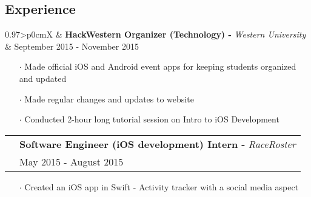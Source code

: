 \documentclass[letterpaper, oneside, final]{scrartcl} %
\newcommand{\gray}{\rowcolor[gray]{.90}} %
\begin{document}
\begin{center}

\vspace{-3mm}

\section{Experience}

\renewcommand{\arraystretch}{1.3}

\begin{tabularx}{0.97\linewidth}{>{\raggedleft\scshape}p{0cm}X}
\gray & \textbf{HackWestern Organizer (Technology) -} \textit{Western University}\\
\gray & {September 2015 - November 2015}\\
\end{tabularx}
\vspace{-0.1cm}
\begin{itemize} \itemsep-0.2cm
\item[$\cdot$] Made official iOS and Android event apps for keeping students organized and updated
\item[$\cdot$]  Made regular changes and updates to website\\
\item[$\cdot$]  Conducted 2-hour long tutorial session on Intro to iOS Development \\
\end{itemize}

\vspace{-0.05cm}

\begin{tabularx}{0.97\linewidth}{>{\raggedleft\scshape}p{0cm}X}
\gray & \textbf{Software Engineer (iOS development) Intern -} \textit{RaceRoster}\\
\gray & {May 2015 - August 2015}\\
\end{tabularx}
\vspace{-0.1cm}
\begin{itemize} \itemsep-0.2cm
\item[$\cdot$] Created an iOS app in Swift - Activity tracker with a social media aspect \\
\end{itemize}

\vspace{-0.05cm}


\end{center}
\end{document}
